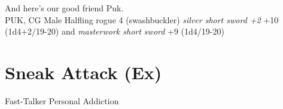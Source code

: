 And here's our good friend Puk.\\

PUK, CG Male Halfling rogue 4 (swashbuckler)        {\itshape silver short sword +2} +10 (1d4+2/19-20) and  {\itshape masterwork short sword} +9 (1d4/19-20)         \section{Sneak Attack (Ex)}

Fast-Talker  Personal Addiction 